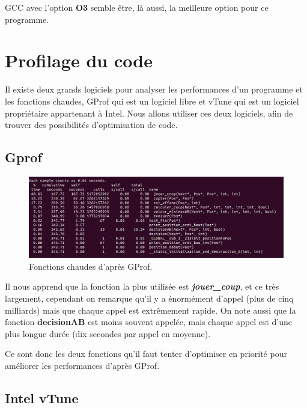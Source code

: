 \documentclass[
 aip,
 jmp,
 amsmath,amssymb,
 reprint
]{revtex4-1}
\begin{document}
GCC avec l'option \textbf{O3} semble être, là aussi, la meilleure option pour ce programme.

\section{Profilage du code}

Il existe deux grands logiciels pour analyser les performances d'un programme et les fonctions chaudes, GProf qui est un logiciel libre et vTune qui est un logiciel propriétaire appartenant à Intel. Nous allons utiliser ces deux logiciels, afin de trouver des possibilités d'optimisation de code.

\subsection{Gprof}

\begin{figure}[H]
  \includegraphics[width=\linewidth, keepaspectratio=true]{gprof1.png}
  \caption{Fonctions chaudes d'après GProf.\label{Fig:gprof_flat}}
\end{figure}

Il nous apprend que la fonction la plus utilisée est \textbf{\textit{jouer\_coup}}, et ce très largement, cependant on remarque qu'il y a énormément d'appel (plus de cinq milliards) mais que chaque appel est extrêmement rapide. On note aussi que la fonction \textbf{decisionAB} est moins souvent appelée, mais chaque appel est d'une plus longue durée (dix secondes par appel en moyenne).\par
Ce sont donc les deux fonctions qu'il faut tenter d'optimiser en priorité pour améliorer les performances d'après GProf.

\subsection{Intel vTune}
\end{document}
